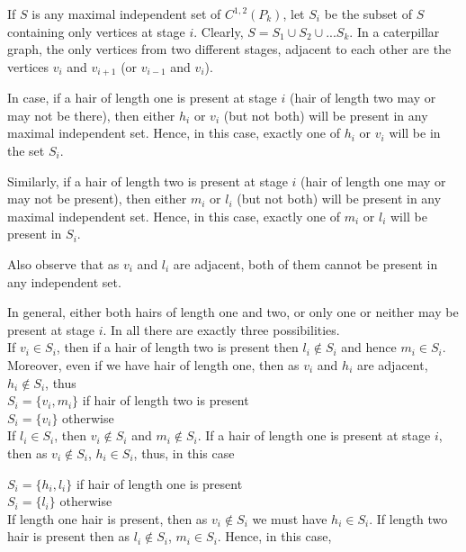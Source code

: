 \documentclass[10pt]{article}
\begin{document}
If $S$ is any maximal independent set of $C^{1,2}(P_k)$, let $S_i$ be the
subset of $S$ containing only vertices at stage $i$. Clearly, $S=S_1 \cup
S_2 \cup ...  S_k$.  In a caterpillar graph, the only vertices from two
different stages, adjacent to each other are the vertices $v_i$ and
$v_{i+1}$ (or $v_{i-1}$ and $v_i$).

In case, if a hair of length one is present at stage $i$ (hair of length
two may or may not be there), then either $h_i$ or $v_i$ (but not both)
will be present in any maximal independent set. Hence, in this case,
exactly one of $h_i$ or $v_i$ will be in the set $S_i$.

Similarly, if a hair of length two is present at stage $i$ (hair of
length one may or may not be present), then either $m_i$ or $l_i$ (but
not both) will be present in any maximal independent set. Hence, in this
case, exactly one of $m_i$ or $l_i$ will be present in $S_i$.

Also observe that as $v_i$ and $l_i$ are adjacent, both of them cannot be
present in any independent set.

In general, either both hairs of length one and two, or only one or
neither may be present at stage $i$. In all there are exactly three
possibilities. \\ 


 If $v_i\in S_i$,
then if a hair of length two is present then $l_i\not\in S_i$ and hence
$m_i\in S_i$. Moreover, even if we have hair of length one, then as $v_i$
and $h_i$ are adjacent, $h_i\not\in S_i$, thus \\

\noindent \noindent $S_i= \{v_i,m_i\}$ if hair of length two is present \\ $S_i= \{v_i\}$
otherwise\\

 If $l_i\in S_i$, then $v_i\not\in
S_i$ and $m_i\not\in S_i$. If a hair of length one is present at stage
$i$, then as $v_i\not\in S_i$, $h_i\in S_i$, thus, in this case

\noindent $S_i= \{h_i,l_i\}$ if hair of length one is present \\ $S_i=\{l_i\}$ 
otherwise\\

 If length one hair is present,
then as $v_i\not\in S_i$ we must have $h_i\in S_i$. If length two hair is
present then as $l_i\not\in S_i$, $m_i\in S_i$. Hence, in this case,
\end{document}

